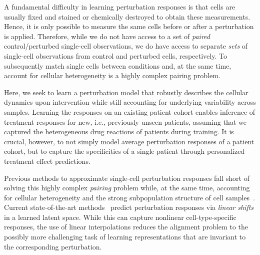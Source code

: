  A fundamental difficulty in learning perturbation responses is that cells are usually fixed and stained or chemically destroyed to obtain these measurements. Hence, it is only possible to measure the same cells  before or after a perturbation is applied. 
Therefore, while we do not have access to a set of {\em paired} control/perturbed single-cell observations, we do have access to separate \emph{sets} of single-cell observations from control and perturbed cells, respectively. To subsequently match single cells between conditions and, at the same time, account for cellular heterogeneity is a highly complex pairing problem.

Here, we seek to learn a perturbation model that robustly describes the cellular dynamics upon intervention while still accounting for underlying variability across samples. Learning the responses on an existing patient cohort enables inference of treatment responses for new, i.e., previously unseen patients, assuming that we captured the heterogeneous drug reactions of patients during training.
It is crucial, however, to not simply model average perturbation responses of a patient cohort, but to capture the specificities of a single patient through personalized treatment effect predictions.

 Previous methods to approximate single-cell perturbation responses fall short of solving this highly complex \emph{pairing} problem while, at the same time, accounting for cellular heterogeneity and the strong subpopulation structure of cell samples~\citep{wu2021single,gonzalez2020tumor,li2022single}. 
Current state-of-the-art methods~\citep{Lopez2018scvi, lotfollahi2019scgen, yang2020predicting} predict perturbation responses via \emph{linear shifts} in a learned %
latent space.
While this can capture nonlinear cell-type-specific responses, the use of linear interpolations reduces the alignment problem to the possibly more challenging task of learning representations that are invariant to the corresponding perturbation. 

